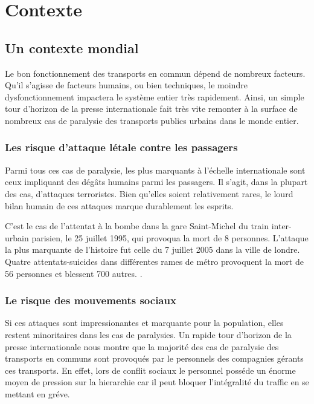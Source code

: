 \chapter{Contexte}

	\section{Un contexte mondial}

	Le bon fonctionnement des transports en commun dépend de nombreux facteurs. Qu'il s'agisse de facteurs humains, ou bien techniques, le moindre dysfonctionnement impactera le système entier très rapidement. Ainsi, un simple tour d'horizon de la presse internationale fait très vite remonter à la surface de nombreux cas de paralysie des transports publics urbains dans le monde entier.

		\subsection{ Les risque d'attaque létale contre les passagers }

	Parmi tous ces cas de paralysie, les plus marquants à l'échelle internationale sont ceux impliquant des dégâts humains parmi les passagers. Il s'agit, dans la plupart des cas, d'attaques terroristes. Bien qu'elles soient relativement rares, le lourd bilan humain de ces attaques marque durablement les esprits.

	C'est le cas de l'attentat à la bombe dans la gare Saint-Michel du train inter-urbain parisien, le 25 juillet 1995, qui provoqua la mort de 8 personnes\cite{stmichel}. L'attaque la plus marquante de l'histoire fut celle du 7 juillet 2005 dans la ville de londre. Quatre attentats-suicides dans différentes rames de métro provoquent la mort de 56 personnes et blessent 700 autres. \cite{ london_attacks}.


    	\subsection{ Le risque des mouvements sociaux }
    	
	Si ces attaques sont impressionantes et marquante pour la population, elles restent minoritaires dans les cas de paralysies. Un rapide tour d'horizon de la presse internationale nous montre que la majorité des cas de paralysie des transports en communs sont provoqués par le personnels des compagnies gérants ces transports. En effet, lors de conflit sociaux le personnel posséde un énorme moyen de pression sur la hierarchie car il peut bloquer l'intégralité du traffic en se mettant en gréve. 

